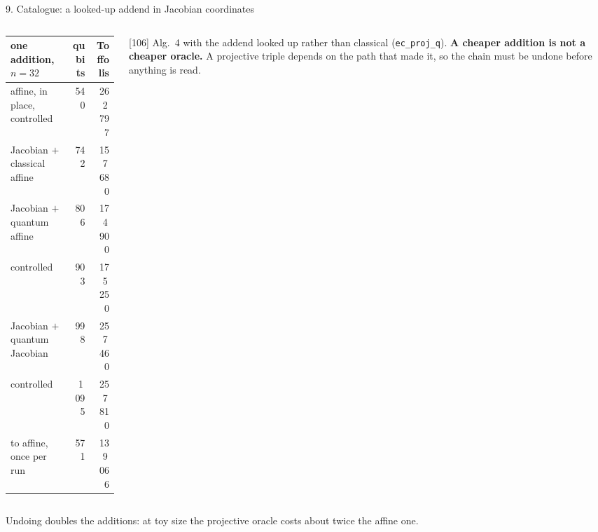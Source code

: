 \documentclass[aspectratio=169,11pt]{beamer}
\begin{document}
\begin{frame}{9. Catalogue: a looked-up addend in Jacobian coordinates}
  \begin{columns}[T]
    \begin{column}{0.54\textwidth}
      \centering\footnotesize
      \renewcommand{\arraystretch}{1.1}
      \begin{tabular}{@{}lrr@{}}
        \toprule
        one addition, $n=32$ & qubits & Toffolis \\
        \midrule
        affine, in place, controlled & 540 & 262\,797 \\
        Jacobian $+$ classical affine & 742 & 157\,680 \\
        Jacobian $+$ quantum affine & 806 & 174\,900 \\
        \quad controlled & 903 & 175\,250 \\
        Jacobian $+$ quantum Jacobian & 998 & 257\,460 \\
        \quad controlled & 1\,095 & 257\,810 \\
        \midrule
        to affine, once per run & 571 & 139\,066 \\
        \bottomrule
      \end{tabular}
    \end{column}
    \begin{column}{0.42\textwidth}
      \small [106] Alg.~4 with the addend looked up rather than classical (\texttt{ec\_proj\_q}).
      \vskip2mm
      \textbf{A cheaper addition is not a cheaper oracle.} A projective triple depends on the path that made it, so the chain must be undone before anything is read.
    \end{column}
  \end{columns}
  \vskip3mm
  \centering
  \par
  {\scriptsize Undoing doubles the additions: at toy size the projective oracle costs about twice the affine one.}
\end{frame}
\end{document}
